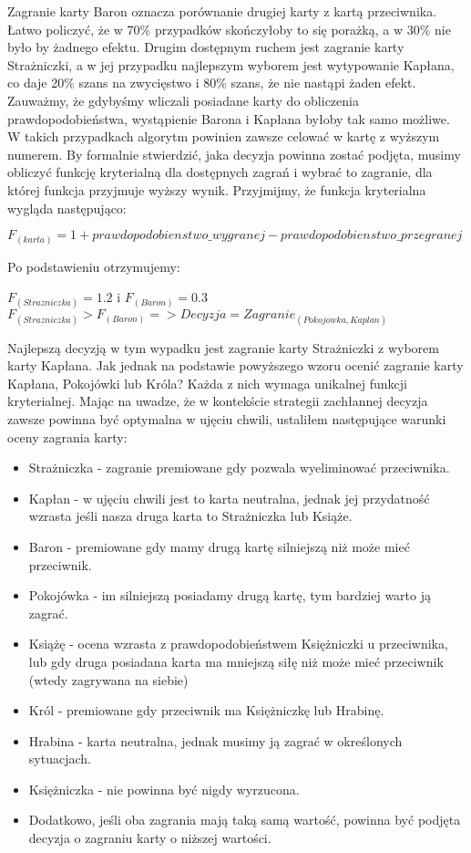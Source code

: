 Zagranie karty Baron oznacza porównanie drugiej karty z kartą przeciwnika. Łatwo policzyć, że w 70\% przypadków skończyłoby to się porażką, a w 30\% nie było by żadnego efektu. Drugim dostępnym ruchem jest zagranie karty Strażniczki, a w jej przypadku najlepszym wyborem jest wytypowanie Kapłana, co daje 20\% szans na zwycięstwo i 80\% szans, że nie nastąpi żaden efekt. Zauważmy, że gdybyśmy wliczali posiadane karty do obliczenia prawdopodobieństwa, wystąpienie Barona i Kapłana byłoby tak samo możliwe. W takich przypadkach algorytm powinien zawsze celować w kartę z wyższym numerem. By formalnie stwierdzić, jaka decyzja powinna zostać podjęta, musimy obliczyć funkcję kryterialną dla dostępnych zagrań i wybrać to zagranie, dla której funkcja przyjmuje wyższy wynik. Przyjmijmy, że funkcja kryterialna wygląda następująco:

\begin{center}
	$F_{(karta)} = 1 + prawdopodobienstwo\_wygranej - prawdopodobienstwo\_przegranej$
\end{center}
Po podstawieniu otrzymujemy:
\begin{center}
 $F_{(Strazniczka)}=1.2$ i $F_{(Baron)} = 0.3$
 \\
 $F_{(Strazniczka)}>F_{(Baron)} => Decyzja=Zagranie_{(Pokojowka, Kaplan)}$ 
 \end{center} 

Najlepszą decyzją w tym wypadku jest zagranie karty Strażniczki z wyborem karty Kapłana. Jak jednak na podstawie powyższego wzoru ocenić zagranie karty Kapłana, Pokojówki lub Króla? Każda z nich wymaga unikalnej funkcji kryterialnej. Mając na uwadze, że w kontekście strategii zachłannej decyzja zawsze powinna być optymalna w ujęciu chwili, ustaliłem następujące warunki oceny zagrania karty:
\begin{itemize}
	\item Strażniczka - zagranie premiowane gdy pozwala wyeliminować przeciwnika.
	\item Kapłan - w ujęciu chwili jest to karta neutralna, jednak jej przydatność wzrasta jeśli nasza druga karta to Strażniczka lub Książe.
	\item Baron - premiowane gdy mamy drugą kartę silniejszą niż może mieć przeciwnik.
	\item Pokojówka - im silniejszą posiadamy drugą kartę, tym bardziej warto ją zagrać.
	\item Książę - ocena wzrasta z prawdopodobieństwem Księżniczki u przeciwnika, lub gdy druga posiadana karta ma mniejszą siłę niż może mieć przeciwnik (wtedy zagrywana na siebie)
	\item Król - premiowane gdy przeciwnik ma Księżniczkę lub Hrabinę.
	\item Hrabina - karta neutralna, jednak musimy ją zagrać w określonych sytuacjach.
	\item Księżniczka - nie powinna być nigdy wyrzucona.
	\item Dodatkowo, jeśli oba zagrania mają taką samą wartość, powinna być podjęta decyzja o zagraniu karty o niższej wartości.
\end{itemize}

